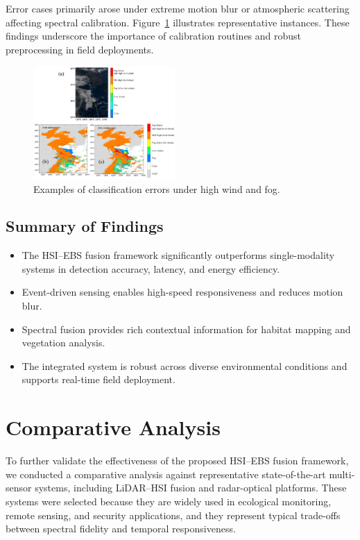 \documentclass[conference]{IEEEtran}
\begin{document}
Error cases primarily arose under extreme motion blur or atmospheric scattering affecting spectral calibration. Figure~\ref{fig:error} illustrates representative instances. These findings underscore the importance of calibration routines and robust preprocessing in field deployments.

\begin{figure}[H]
    \centering
    \includegraphics[width=0.48\textwidth]{HighWind.png}
    \caption{Examples of classification errors under high wind and fog.}
    \label{fig:error}
\end{figure}

\subsection{Summary of Findings}

\begin{itemize}
    \item The HSI–EBS fusion framework significantly outperforms single-modality systems in detection accuracy, latency, and energy efficiency.
    \item Event-driven sensing enables high-speed responsiveness and reduces motion blur.
    \item Spectral fusion provides rich contextual information for habitat mapping and vegetation analysis.
    \item The integrated system is robust across diverse environmental conditions and supports real-time field deployment.
\end{itemize}


\section{Comparative Analysis}

To further validate the effectiveness of the proposed HSI–EBS fusion framework, we conducted a comparative analysis against representative state-of-the-art multi-sensor systems, including LiDAR–HSI fusion and radar-optical platforms. These systems were selected because they are widely used in ecological monitoring, remote sensing, and security applications, and they represent typical trade-offs between spectral fidelity and temporal responsiveness.
\end{document}
